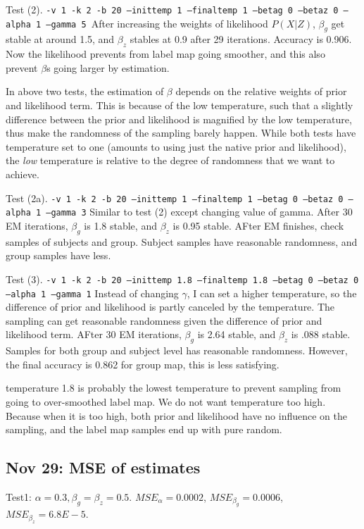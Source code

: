 \documentclass{article}
\begin{document}
Test (2). \texttt{-v 1 -k 2 -b 20 --inittemp 1 --finaltemp 1 --betag 0 --betaz 0 --alpha 1 --gamma 5 }After increasing the weights of likelihood $P(X|Z)$, $\beta_g$ get stable at around 1.5, and $\beta_z$ stables at 0.9 after 29 iterations. Accuracy is 0.906. Now the likelihood prevents from label map going smoother, and this also prevent $\beta$s going larger by estimation.

In above two tests, the estimation of $\beta$ depends on the relative weights of prior and likelihood term. This is because of the low temperature, such that a slightly difference between the prior and likelihood is magnified by the low temperature, thus make the randomness of the sampling barely happen. While both tests have temperature set to one (amounts to using just the native prior and likelihood), the \emph{low} temperature is relative to the degree of randomness that we want to achieve.

Test (2a). \texttt{-v 1 -k 2 -b 20 --inittemp 1 --finaltemp 1 --betag 0 --betaz 0 --alpha 1 --gamma 3} Similar to test (2) except changing value of gamma. After 30 EM iterations, $\beta_g$ is 1.8 stable, and $\beta_z$ is 0.95 stable. AFter EM finishes, check samples of subjects and group. Subject samples have reasonable randomness, and group samples have less.

Test (3). \texttt{-v 1 -k 2 -b 20 --inittemp 1.8 --finaltemp 1.8 --betag 0 --betaz 0 --alpha 1 --gamma 1} Instead of changing $\gamma$, I can set a higher temperature, so the difference of prior and likelihood is partly canceled by the temperature. The sampling can get reasonable randomness given the difference of prior and likelihood term. AFter 30 EM iterations, $\beta_g$ is 2.64 stable, and $\beta_z$ is .088 stable. Samples for both group and subject level has reasonable randomness. However, the final accuracy is 0.862 for group map, this is less satisfying.

temperature 1.8 is probably the lowest temperature to prevent sampling from going to over-smoothed label map. We do not want temperature too high. Because when it is too high, both prior and likelihood have no influence on the sampling, and the label map samples end up with pure random.

\subsection{Nov 29: MSE of estimates}
Test1: $\alpha = 0.3, \beta_g = \beta_z = 0.5$. $MSE_{\alpha} = 0.0002$, $MSE_{\beta_g} = 0.0006$, $MSE_{\beta_z} = 6.8E-5$.
\end{document}
